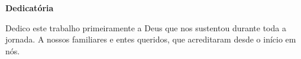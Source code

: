 \clearpage


\begin{center}
\textbf{Dedicatória}
\end{center}

Dedico este trabalho primeiramente a Deus que nos sustentou durante toda a jornada. A nossos familiares e entes queridos, que acreditaram desde o início em nós.

\begin{comment}
\begin{flushright}
  \emph{\bfseries Dedicatória}
\end{flushright}
\begin{flushleft}
  Dedico este trabalho primeiramente a Deus que nos sustentou durante toda a jornada. A nossos familiares e entes queridos, que acreditaram desde o início em nós.
\end{flushleft}
\end{comment}
